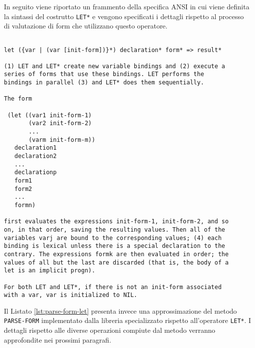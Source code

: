 In seguito viene riportato un frammento della specifica ANSI in cui viene
definita la sintassi del costrutto \texttt{LET*} e vengono specificati i
dettagli rispetto al processo di valutazione di form che utilizzano questo
operatore.

\begin{lstlisting}[caption=Estratto della documentazione relativa al costrutto
\texttt{LET*}]

let ({var | (var [init-form])}*) declaration* form* => result*

(1) LET and LET* create new variable bindings and (2) execute a
series of forms that use these bindings. LET performs the
bindings in parallel (3) and LET* does them sequentially.

The form

 (let ((var1 init-form-1)
       (var2 init-form-2)
       ...
       (varm init-form-m))
   declaration1
   declaration2
   ...
   declarationp
   form1
   form2
   ...
   formn)

first evaluates the expressions init-form-1, init-form-2, and so
on, in that order, saving the resulting values. Then all of the
variables varj are bound to the corresponding values; (4) each
binding is lexical unless there is a special declaration to the
contrary. The expressions formk are then evaluated in order; the
values of all but the last are discarded (that is, the body of a
let is an implicit progn).

For both LET and LET*, if there is not an init-form associated
with a var, var is initialized to NIL.

\end{lstlisting}

Il Listato \ref{lst:parse-form-let} presenta invece una approssimazione del
metodo \texttt{PARSE-FORM} implementato dalla libreria specializzato rispetto
all'operatore \texttt{LET*}. I dettagli rispetto alle diverse operazioni
compiute dal metodo verranno approfondite nei prossimi paragrafi.

